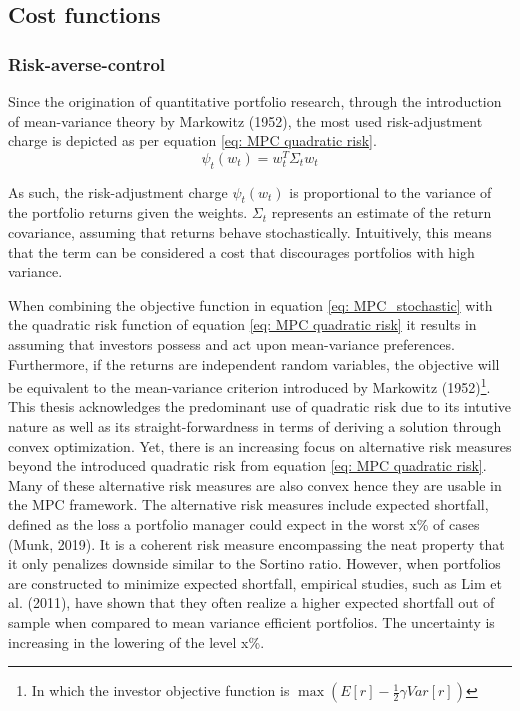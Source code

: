 \subsection{Cost functions}

\subsubsection{Risk-averse-control}
Since the origination of quantitative portfolio research, through the introduction of mean-variance theory by Markowitz (1952), the most used risk-adjustment charge is depicted as per equation \ref{eq: MPC quadratic risk}.
\begin{equation}
    \psi_t(w_t) = w_t^T\Sigma_tw_t
    \label{eq: MPC quadratic risk}
\end{equation}

As such, the risk-adjustment charge $\psi_t(w_t)$ is proportional to the variance of the portfolio returns given the weights. $\Sigma_t$ represents an estimate of the return covariance, assuming that returns behave stochastically. Intuitively, this means that the term can be considered a cost that discourages portfolios with high variance. 

When combining the objective function in equation \ref{eq: MPC_stochastic} with the quadratic risk function of equation \ref{eq: MPC quadratic risk} it results in assuming that investors possess and act upon mean-variance preferences. Furthermore, if the returns are independent random variables, the objective will be equivalent to the mean-variance criterion introduced by Markowitz (1952)\footnote{
In which the investor objective function is $\max \left(E[r] - \frac{1}{2}\gamma Var[r] \right)$}. This thesis acknowledges the predominant use of quadratic risk due to its intutive nature as well as its straight-forwardness in terms of deriving a solution through convex optimization. Yet, there is an increasing focus on alternative risk measures beyond the introduced quadratic risk from equation \ref{eq: MPC quadratic risk}. Many of these alternative risk measures are also convex hence they are usable in the MPC framework. The alternative risk measures include expected shortfall, defined as the loss a portfolio manager could expect in the worst x\% of cases (Munk, 2019). It is a coherent risk measure encompassing the neat property that it only penalizes downside similar to the Sortino ratio. However, when portfolios are constructed to minimize expected shortfall, empirical studies, such as Lim et al. (2011), have shown that they often realize a higher expected shortfall out of sample when compared to mean variance efficient portfolios. The uncertainty is increasing in the lowering of the level x\%. 

